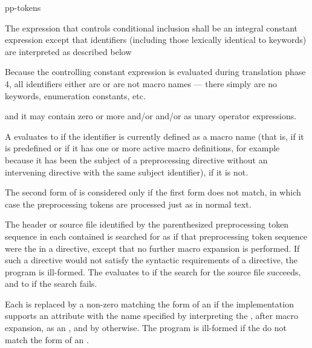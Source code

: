 \documentclass{wg21}
\begin{document}
%
\begin{bnf}
    \br
     pp-tokens \terminal{)}
\end{bnf}

\pnum
The expression that controls conditional inclusion
shall be an integral constant expression except that
identifiers
(including those lexically identical to keywords)
are interpreted as described below
\begin{footnote}
    Because the controlling constant expression is evaluated
    during translation phase 4,
    all identifiers either are or are not macro names ---
    there simply are no keywords, enumeration constants, etc.
\end{footnote}
and it may contain zero or more  and/or
 and/or
 as unary operator expressions.

\pnum
A  evaluates to 
if the identifier is currently defined
as a macro name
(that is, if it is predefined
or if it has one or more active macro definitions,
for example because
it has been the subject of a
preprocessing directive
without an intervening
directive with the same subject identifier),  if it is not.

\pnum
The second form of 
is considered only if the first form does not match,
in which case the preprocessing tokens are processed just as in normal text.

\pnum
The header or source file identified by
the parenthesized preprocessing token sequence
in each contained 
is searched for as if that preprocessing token sequence
were the  in a  directive,
except that no further macro expansion is performed.
If such a directive would not satisfy the syntactic requirements
of a  directive, the program is ill-formed.
The  evaluates
to  if the search for the source file succeeds, and
to  if the search fails.

\pnum
Each  is replaced by
a non-zero 
matching the form of an 
if the implementation supports an attribute
with the name specified by interpreting
the , after macro expansion,
as an ,
and by  otherwise.
The program is ill-formed if the 
do not match the form of an .
\end{document}
